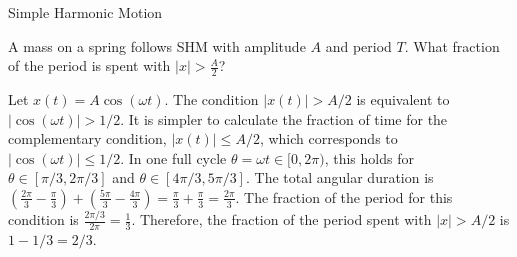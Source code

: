 \begin{KnowledgePoint}{Simple Harmonic Motion \Core}
  \KPProblems
  \begin{cheatproblem}
  A mass on a spring follows SHM with amplitude $A$ and period $T$. What fraction of the period is spent with $|x|>\tfrac{A}{2}$?
  \begin{solutionbox}
  Let $x(t)=A\cos(\omega t)$. The condition $|x(t)|>A/2$ is equivalent to $|\cos(\omega t)|>1/2$. It is simpler to calculate the fraction of time for the complementary condition, $|x(t)|\le A/2$, which corresponds to $|\cos(\omega t)|\le 1/2$.
  In one full cycle $\theta=\omega t \in [0, 2\pi)$, this holds for $\theta \in [\pi/3, 2\pi/3]$ and $\theta \in [4\pi/3, 5\pi/3]$. The total angular duration is $(\frac{2\pi}{3}-\frac{\pi}{3}) + (\frac{5\pi}{3}-\frac{4\pi}{3}) = \frac{\pi}{3}+\frac{\pi}{3}=\frac{2\pi}{3}$.
  The fraction of the period for this condition is $\frac{2\pi/3}{2\pi}=\frac{1}{3}$.
  Therefore, the fraction of the period spent with $|x|>A/2$ is $1 - 1/3 = 2/3$.
  \end{solutionbox}
  \end{cheatproblem}
\end{KnowledgePoint}

